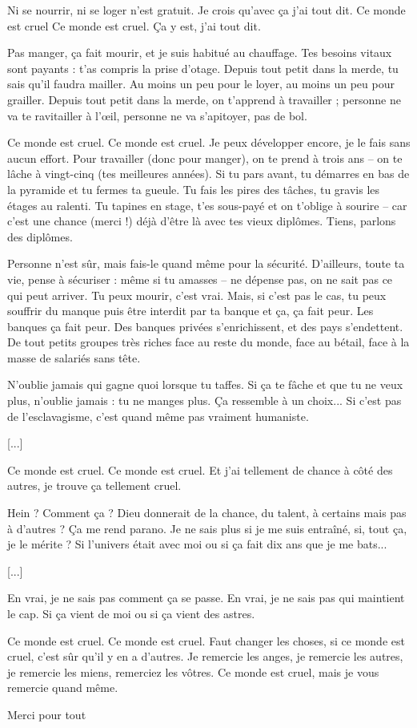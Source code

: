 
Ni se nourrir, ni se loger n'est gratuit.
Je crois qu'avec ça j'ai tout dit.
Ce monde est cruel
Ce monde est cruel.
Ça y est, j'ai tout dit.

Pas manger, ça fait mourir, et je suis habitué au chauffage.
Tes besoins vitaux sont payants : t'as compris la prise d'otage.
Depuis tout petit dans la merde, tu sais qu'il faudra mailler.
Au moins un peu pour le loyer, au moins un peu pour grailler.
Depuis tout petit dans la merde, on t'apprend à travailler ;
personne ne va te ravitailler à l'œil,
personne ne va s'apitoyer, pas de bol.

Ce monde est cruel.
Ce monde est cruel.
Je peux développer encore, je le fais sans aucun effort.
Pour travailler (donc pour manger), on te prend à trois ans
-- on te lâche à vingt-cinq (tes meilleures années).
Si tu pars avant, tu démarres en bas de la pyramide
et tu fermes ta gueule. Tu fais les pires des tâches,
tu gravis les étages au ralenti. Tu tapines en stage,
t'es sous-payé et on t'oblige à sourire --
car c'est une chance (merci !) déjà d'être là
avec tes vieux diplômes. Tiens, parlons des diplômes.

Personne n'est sûr, mais fais-le quand même pour la sécurité.
D'ailleurs, toute ta vie, pense à sécuriser :
même si tu amasses -- ne dépense pas,
on ne sait pas ce qui peut arriver.
Tu peux mourir, c'est vrai. Mais, si c'est pas le cas,
tu peux souffrir du manque puis être interdit par ta banque
et ça, ça fait peur. Les banques ça fait peur.
Des banques privées s'enrichissent, et des pays s'endettent.
De tout petits groupes très riches face au reste du monde,
face au bétail, face à la masse de salariés sans tête.

N'oublie jamais qui gagne quoi lorsque tu taffes.
Si ça te fâche et que tu ne veux plus,
n'oublie jamais : tu ne manges plus.
Ça ressemble à un choix...
Si c'est pas de l'esclavagisme,
c'est quand même pas vraiment humaniste.

[...]

Ce monde est cruel.
Ce monde est cruel.
Et j'ai tellement de chance à côté des autres,
je trouve ça tellement cruel.

Hein ? Comment ça ? Dieu donnerait de la chance, du talent,
à certains mais pas à d'autres ? Ça me rend parano.
Je ne sais plus si je me suis entraîné, si, tout ça, je le mérite ?
Si l'univers était avec moi ou si ça fait dix ans que je me bats...

[...]

En vrai, je ne sais pas comment ça se passe.
En vrai, je ne sais pas qui maintient le cap.
Si ça vient de moi ou si ça vient des astres.

Ce monde est cruel.
Ce monde est cruel.
Faut changer les choses, si ce monde est cruel,
c'est sûr qu'il y en a d'autres.
Je remercie les anges, je remercie les autres,
je remercie les miens, remerciez les vôtres.
Ce monde est cruel, mais je vous remercie quand même.

Merci pour tout
